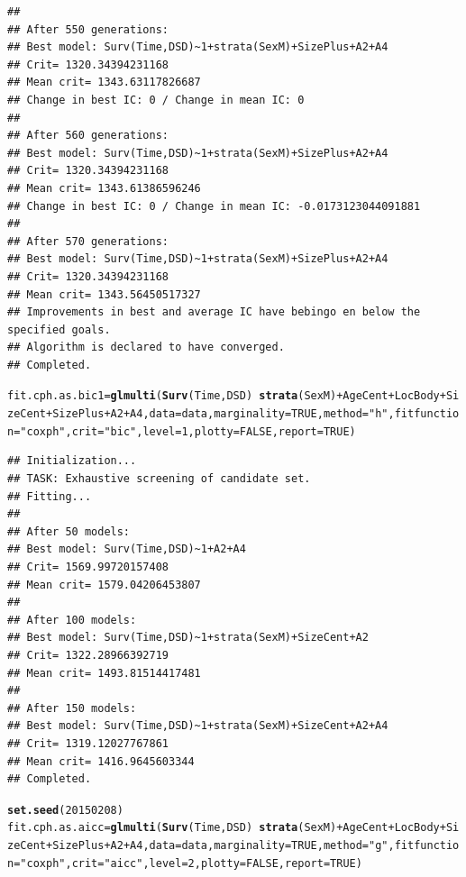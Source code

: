 \documentclass{article}\usepackage[]{graphicx}\usepackage[]{color}
\makeatletter
\newcommand{\hlnum}[1]{\textcolor[rgb]{0.686,0.059,0.569}{#1}}%
\newcommand{\hlstr}[1]{\textcolor[rgb]{0.192,0.494,0.8}{#1}}%
\newcommand{\hlopt}[1]{\textcolor[rgb]{0,0,0}{#1}}%
\newcommand{\hlstd}[1]{\textcolor[rgb]{0.345,0.345,0.345}{#1}}%
\newcommand{\hlkwb}[1]{\textcolor[rgb]{0.69,0.353,0.396}{#1}}%
\newcommand{\hlkwc}[1]{\textcolor[rgb]{0.333,0.667,0.333}{#1}}%
\newcommand{\hlkwd}[1]{\textcolor[rgb]{0.737,0.353,0.396}{\textbf{#1}}}%
\newenvironment{kframe}{%
 \def\at@end@of@kframe{}%
 \ifinner\ifhmode%
  \def\at@end@of@kframe{\end{minipage}}%
  \begin{minipage}{\columnwidth}%
 \fi\fi%
 \def\FrameCommand##1{\hskip\@totalleftmargin \hskip-\fboxsep
 \colorbox{shadecolor}{##1}\hskip-\fboxsep
     \hskip-\linewidth \hskip-\@totalleftmargin \hskip\columnwidth}%
 \MakeFramed {\advance\hsize-\width
   \@totalleftmargin\z@ \linewidth\hsize
   \@setminipage}}%
 {\par\unskip\endMakeFramed%
 \at@end@of@kframe}
\newenvironment{knitrout}{}{} %
\makeatother
\begin{document}
\begin{knitrout}
\begin{kframe}
{\ttfamily\noindent\color{warningcolor}{\#\# Warning in fitter(X, Y, strats, offset, init, control, weights = weights, : Loglik converged before variable\ \ 2 ; beta may be infinite.}}\begin{verbatim}
## 
## After 550 generations:
## Best model: Surv(Time,DSD)~1+strata(SexM)+SizePlus+A2+A4
## Crit= 1320.34394231168
## Mean crit= 1343.63117826687
## Change in best IC: 0 / Change in mean IC: 0
## 
## After 560 generations:
## Best model: Surv(Time,DSD)~1+strata(SexM)+SizePlus+A2+A4
## Crit= 1320.34394231168
## Mean crit= 1343.61386596246
## Change in best IC: 0 / Change in mean IC: -0.0173123044091881
## 
## After 570 generations:
## Best model: Surv(Time,DSD)~1+strata(SexM)+SizePlus+A2+A4
## Crit= 1320.34394231168
## Mean crit= 1343.56450517327
## Improvements in best and average IC have bebingo en below the specified goals.
## Algorithm is declared to have converged.
## Completed.
\end{verbatim}
\begin{alltt}
\hlstd{fit.cph.as.bic1} \hlkwb{=} \hlkwd{glmulti}\hlstd{(}\hlkwd{Surv}\hlstd{(Time, DSD)} \hlopt{~} \hlkwd{strata}\hlstd{(SexM)} \hlopt{+} \hlstd{AgeCent} \hlopt{+} \hlstd{LocBody} \hlopt{+} \hlstd{SizeCent} \hlopt{+} \hlstd{SizePlus} \hlopt{+} \hlstd{A2} \hlopt{+} \hlstd{A4,} \hlkwc{data} \hlstd{= data,} \hlkwc{marginality} \hlstd{=} \hlnum{TRUE}\hlstd{,} \hlkwc{method} \hlstd{=} \hlstr{"h"}\hlstd{,} \hlkwc{fitfunction} \hlstd{=} \hlstr{"coxph"}\hlstd{,} \hlkwc{crit} \hlstd{=} \hlstr{"bic"}\hlstd{,} \hlkwc{level} \hlstd{=} \hlnum{1}\hlstd{,} \hlkwc{plotty} \hlstd{=} \hlnum{FALSE}\hlstd{,} \hlkwc{report} \hlstd{=} \hlnum{TRUE}\hlstd{)}
\end{alltt}
\begin{verbatim}
## Initialization...
## TASK: Exhaustive screening of candidate set.
## Fitting...
## 
## After 50 models:
## Best model: Surv(Time,DSD)~1+A2+A4
## Crit= 1569.99720157408
## Mean crit= 1579.04206453807
## 
## After 100 models:
## Best model: Surv(Time,DSD)~1+strata(SexM)+SizeCent+A2
## Crit= 1322.28966392719
## Mean crit= 1493.81514417481
## 
## After 150 models:
## Best model: Surv(Time,DSD)~1+strata(SexM)+SizeCent+A2+A4
## Crit= 1319.12027767861
## Mean crit= 1416.9645603344
## Completed.
\end{verbatim}
\begin{alltt}
\hlkwd{set.seed}\hlstd{(}\hlnum{20150208}\hlstd{)}
\hlstd{fit.cph.as.aicc} \hlkwb{=} \hlkwd{glmulti}\hlstd{(}\hlkwd{Surv}\hlstd{(Time, DSD)} \hlopt{~} \hlkwd{strata}\hlstd{(SexM)} \hlopt{+} \hlstd{AgeCent} \hlopt{+} \hlstd{LocBody} \hlopt{+} \hlstd{SizeCent} \hlopt{+} \hlstd{SizePlus} \hlopt{+} \hlstd{A2} \hlopt{+} \hlstd{A4,} \hlkwc{data} \hlstd{= data,} \hlkwc{marginality} \hlstd{=} \hlnum{TRUE}\hlstd{,} \hlkwc{method} \hlstd{=} \hlstr{"g"}\hlstd{,} \hlkwc{fitfunction} \hlstd{=} \hlstr{"coxph"}\hlstd{,} \hlkwc{crit} \hlstd{=} \hlstr{"aicc"}\hlstd{,} \hlkwc{level} \hlstd{=} \hlnum{2}\hlstd{,} \hlkwc{plotty} \hlstd{=} \hlnum{FALSE}\hlstd{,} \hlkwc{report} \hlstd{=} \hlnum{TRUE}\hlstd{)}

\end{alltt}
\end{kframe}
\end{knitrout}
\end{document}
